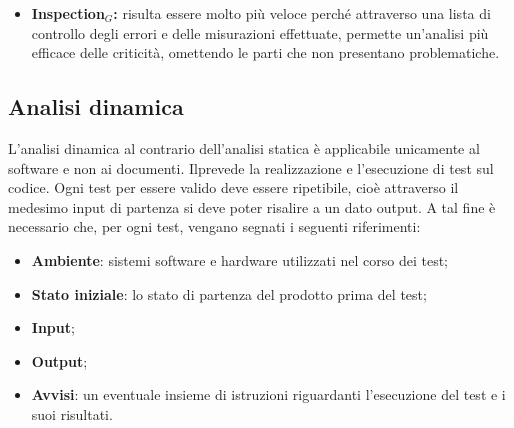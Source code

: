 \begin{itemize}
\begin{itemize}
\item \textbf{Inspection$_{G}$:} risulta essere molto più veloce perché attraverso una lista di controllo degli
errori e delle misurazioni effettuate, permette un'analisi più efficace delle
criticità, omettendo le parti che non presentano problematiche.
\end{itemize}
	
\subsection{Analisi dinamica}	L'analisi dinamica al contrario dell'analisi statica è applicabile unicamente
al software e non ai documenti. Ilprevede la realizzazione e l'esecuzione di test sul codice. Ogni test per essere valido deve essere ripetibile, cioè attraverso il medesimo input di partenza si deve poter risalire a un dato output. A tal fine è necessario che, per ogni test, vengano segnati i seguenti
riferimenti:

\begin{itemize}
	\item \textbf{Ambiente}: sistemi software e hardware utilizzati nel corso dei
	test;
	\item \textbf{Stato iniziale}: lo stato di partenza del prodotto prima del test;
	\item \textbf{Input};
	\item \textbf{Output};
	\item \textbf{Avvisi}: un eventuale insieme di istruzioni riguardanti l'esecuzione del
test e i suoi risultati.

\end{itemize}


\end{itemize}
